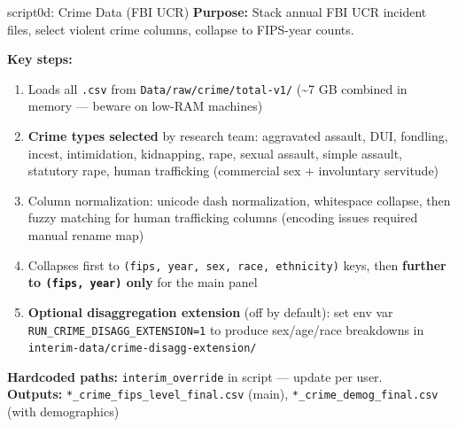 \documentclass[aspectratio=169]{beamer}
\begin{document}
\begin{frame}{script0d: Crime Data (FBI UCR)}
\textbf{Purpose:} Stack annual FBI UCR incident files, select violent crime columns, collapse to FIPS-year counts.

\vspace{0.3em}
\textbf{Key steps:}
\begin{enumerate}\small
    \item Loads all \texttt{.csv} from \texttt{Data/raw/crime/total-v1/} (\textasciitilde 7 GB combined in memory — beware on low-RAM machines)
    \item \textbf{Crime types selected} by research team: aggravated assault, DUI, fondling, incest, intimidation, kidnapping, rape, sexual assault, simple assault, statutory rape, human trafficking (commercial sex + involuntary servitude)
    \item Column normalization: unicode dash normalization, whitespace collapse, then fuzzy matching for human trafficking columns (encoding issues required manual rename map)
    \item Collapses first to \texttt{(fips, year, sex, race, ethnicity)} keys, then \textbf{further to \texttt{(fips, year)} only} for the main panel
    \item \textbf{Optional disaggregation extension} (off by default): set env var \texttt{RUN\_CRIME\_DISAGG\_EXTENSION=1} to produce sex/age/race breakdowns in \texttt{interim-data/crime-disagg-extension/}
\end{enumerate}

\vspace{0.3em}
\textbf{Hardcoded paths:} \texttt{interim\_override} in script — update per user. \\
\textbf{Outputs:} \texttt{*\_crime\_fips\_level\_final.csv} (main), \texttt{*\_crime\_demog\_final.csv} (with demographics)
\end{frame}
\end{document}
